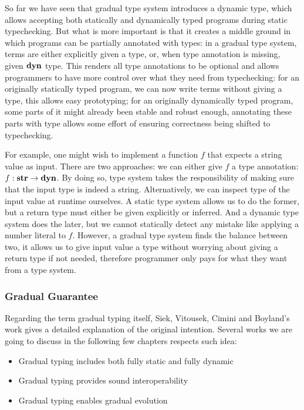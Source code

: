 So far we have seen that gradual type system introduces a dynamic type,
which allows accepting both statically and dynamically typed programs during static typechecking.
But what is more important is that it creates a middle ground in which programs
can be partially annotated with types:
in a gradual type system, terms are either explicitly given a type,
or, when type annotation is missing, given $\textbf{dyn}$ type.
This renders all type annotations to be optional and allows programmers
to have more control over what they need from typechecking:
for an originally statically typed program, we can now write terms without giving a type,
this allows easy prototyping; for an originally dynamically typed program,
some parts of it might already been stable and robust enough, annotating these parts
with type allows some effort of ensuring correctness being shifted to typechecking.

For example, one might wish to implement a function $f$ that expects a string value
as input. There are two approaches: we can either give $f$ a type annotation:
$f : \textbf{str} \rightarrow \textbf{dyn}$. By doing so, type system takes the responsibility
of making sure that the input type is indeed a string. Alternatively,
we can inspect type of the input value at runtime ourselves.
A static type system allows us to do the former, but a return type must either
be given explicitly or inferred. And a dynamic type system does the later, but
we cannot statically detect any mistake like applying a number literal to $f$.
However, a gradual type system finds the balance between two,
it allows us to give input value a type without worrying about
giving a return type if not needed,
therefore programmer only pays for what they want from a type system.




\subsubsection{Gradual Guarantee}

Regarding the term gradual typing itself,
Siek, Vitousek, Cimini and Boyland's work gives a detailed explanation of
the original intention.
Several works we are going to discuss in the following few chapters respects
such idea:

\begin{itemize}
	\item Gradual typing includes both fully static and fully dynamic
	\item Gradual typing provides sound interoperability
	\item Gradual typing enables gradual evolution
\end{itemize}


